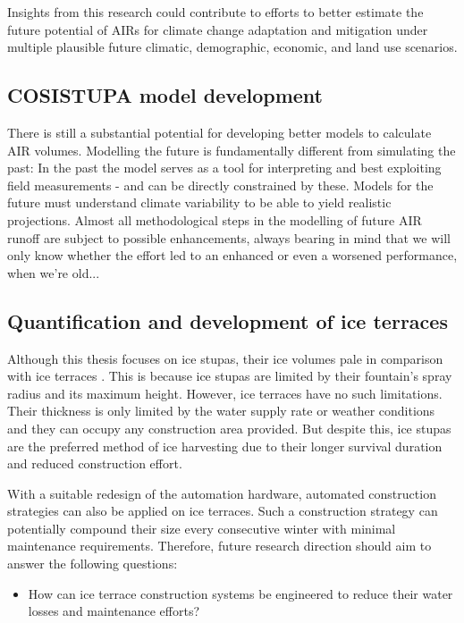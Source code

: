 Insights from this research could contribute to efforts to better estimate the future potential of AIRs for
climate change adaptation and mitigation under multiple plausible future climatic, demographic, economic, and
land use scenarios. 

\subsection{COSISTUPA model development}

There is still a substantial potential for developing better models to calculate AIR volumes. Modelling the
future is fundamentally different from simulating the past: In the past the model serves as a tool for
interpreting and best exploiting field measurements - and can be directly constrained by these. Models for the
future must understand climate variability to be able to yield realistic projections. Almost all methodological
steps in the modelling of future AIR runoff are subject to possible enhancements, always bearing in mind that we
will only know whether the effort led to an enhanced or even a worsened performance, when we're old...

\subsection{Quantification and development of ice terraces}

Although this thesis focuses on ice stupas, their ice volumes pale in comparison with ice terraces
\citep{nusserSociohydrologyArtificialGlaciers2019}. This is because ice stupas are limited by their fountain's
spray radius and its maximum height. However, ice terraces have no such limitations. Their thickness is only
limited by the water supply rate or weather conditions and they can occupy any construction area provided. But
despite this, ice stupas are the preferred method of ice harvesting due to their longer survival duration and
reduced construction effort.

With a suitable redesign of the automation hardware, automated construction strategies can also be applied on
ice terraces. Such a construction strategy can potentially compound their size every consecutive winter with
minimal maintenance requirements. Therefore, future research direction should aim to answer the following
questions:

\begin{itemize}

  \item How can ice terrace construction systems be engineered to reduce their water losses and maintenance
    efforts?

\end{itemize}


